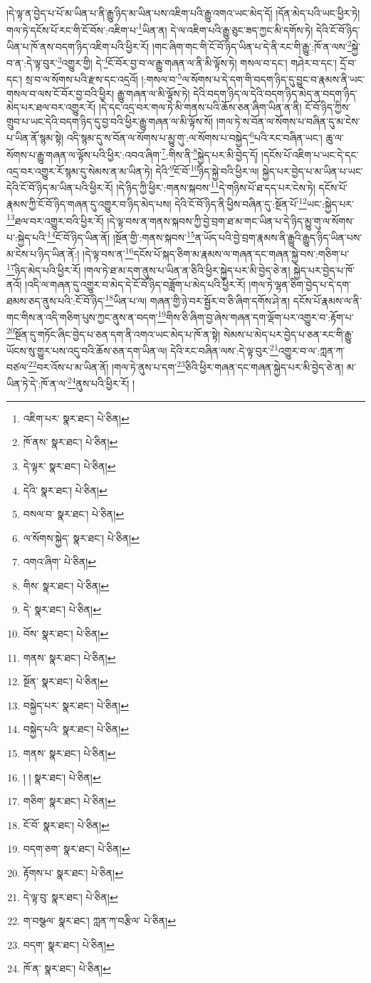 །དེ་ལྟ་ན་བྱེད་པ་པོ་མ་ཡིན་པ་ནི་རྒྱུ་ཉིད་མ་ཡིན་པས་འཇིག་པའི་རྒྱུ་འགའ་ཡང་མེད་དོ། །དོན་མེད་པའི་ཡང་ཕྱིར་ཏེ། གལ་ཏེ་དངོས་པོ་རང་གི་ངོ་བོས་:འཇིག་པ་\footnote{འཇིག་པར་  སྣར་ཐང་།  པེ་ཅིན། }ཡིན་ན། དེ་ལ་འཇིག་པའི་རྒྱུ་ཅུང་ཟད་ཀྱང་མི་དགོས་ཏེ། དེའི་ངོ་བོ་ཉིད་ཡིན་པ་ཁོ་ནས་བདག་ཉིད་འཇིག་པའི་ཕྱིར་རོ། །གང་ཞིག་གང་གི་ངོ་བོ་ཉིད་ཡིན་པ་དེ་ནི་རང་གི་རྒྱུ་:ཁོ་ན་ལས་\footnote{ཁོ་ནས་  སྣར་ཐང་།  པེ་ཅིན། }སྐྱེ་བ་ན་:དེ་ལྟ་བུར་\footnote{དེ་ལྟར་  སྣར་ཐང་།  པེ་ཅིན། }འགྱུར་གྱི། དེ་\footnote{དེའི་  སྣར་ཐང་།  པེ་ཅིན། }ངོ་བོར་བྱ་བ་ལ་རྒྱུ་གཞན་ལ་ནི་མི་ལྟོས་ཏེ། གསལ་བ་དང་། གཤེར་བ་དང་། དྲོ་བ་དང་། སྲ་བ་ལ་སོགས་པའི་རྫས་དང་འདྲའོ། །:གསལ་བ་\footnote{བསལ་བ་  སྣར་ཐང་།  པེ་ཅིན། }ལ་སོགས་པ་དེ་དག་གི་བདག་ཉིད་དུ་བྱུང་བ་རྣམས་ནི་ཡང་གསལ་བ་ལས་ངོ་བོར་བྱ་བའི་ཕྱིར། རྒྱུ་གཞན་ལ་མི་ལྟོས་ཏེ། དེའི་བདག་ཉིད་ལ་དེའི་བདག་ཉིད་མེད་ན་བདག་ཉིད་མེད་པར་ཐལ་བར་འགྱུར་རོ། །དེ་དང་འདྲ་བར་གལ་ཏེ་མི་གནས་པའི་ཆོས་ཅན་ཞིག་ཡིན་ན་ནི། ངོ་བོ་ཉིད་ཀྱིས་གྲུབ་པ་ཡང་དེའི་བདག་ཉིད་དུ་བྱ་བའི་ཕྱིར་རྒྱུ་གཞན་ལ་མི་ལྟོས་སོ། །གལ་ཏེ་ས་བོན་ལ་སོགས་པ་བཞིན་དུ་མ་ངེས་པ་ཡིན་ནོ་སྙམ་སྟེ། འདི་སྙམ་དུ་ས་བོན་ལ་སོགས་པ་མྱུ་གུ་:ལ་སོགས་པ་བསྐྱེད་\footnote{ལ་སོགས་སྐྱེད་  སྣར་ཐང་།  པེ་ཅིན། }པའི་རང་བཞིན་ཡང་། ཆུ་ལ་སོགས་པ་རྒྱུ་གཞན་ལ་ལྟོས་པའི་ཕྱིར་:འབའ་ཞིག་\footnote{འགའ་ཞིག་  པེ་ཅིན། }:གིས་ནི་\footnote{གིས་  སྣར་ཐང་།  པེ་ཅིན། }སྐྱེད་པར་མི་བྱེད་དོ། །དངོས་པོ་འཇིག་པ་ཡང་དེ་དང་འདྲ་བར་འགྱུར་རོ་སྙམ་དུ་སེམས་ན་མ་ཡིན་ཏེ། དེའི་\footnote{དེ་  སྣར་ཐང་།  པེ་ཅིན། }ངོ་བོ་\footnote{བོས་  སྣར་ཐང་།  པེ་ཅིན། }ཉིད་སྐྱེ་བའི་ཕྱིར་ལ། སྐྱེད་པར་བྱེད་པ་མ་ཡིན་པ་ཡང་དེའི་ངོ་བོ་ཉིད་མ་ཡིན་པའི་ཕྱིར་རོ། །དེ་ཉིད་ཀྱི་ཕྱིར་:གནས་སྐབས་\footnote{གནས་  སྣར་ཐང་།  པེ་ཅིན། }དེ་གཉིས་པོ་ཐ་དད་པར་ངེས་ཏེ། དངོས་པོ་རྣམས་ཀྱི་ངོ་བོ་ཉིད་གཞན་དུ་འགྱུར་བ་ཉིད་མེད་པས། དེའི་ངོ་བོ་ཉིད་ནི་ཕྱིས་བཞིན་དུ་:སྔོན་པོ་\footnote{སྔོན་  སྣར་ཐང་།  པེ་ཅིན། }ཡང་:སྐྱེད་པར་\footnote{བསྐྱེད་པར་  སྣར་ཐང་།  པེ་ཅིན། }ཐལ་བར་འགྱུར་བའི་ཕྱིར་རོ། །དེ་ལྟ་བས་ན་གནས་སྐབས་ཀྱི་བྱེ་བྲག་ཐ་མ་གང་ཡིན་པ་དེ་ཉིད་མྱུ་གུ་ལ་སོགས་པ་:སྐྱེད་པའི་\footnote{བསྐྱེད་པའི་  སྣར་ཐང་།  པེ་ཅིན། }ངོ་བོ་ཉིད་ཡིན་ནོ། །སྔོན་གྱི་:གནས་སྐབས་\footnote{གནས་  སྣར་ཐང་།  པེ་ཅིན། }ན་ཡོད་པའི་བྱེ་བྲག་རྣམས་ནི་རྒྱུའི་རྒྱུད་ཉིད་ཡིན་པས་མ་ངེས་པ་ཉིད་ཡིན་ནོ:། །དེ་ལྟ་བས་ན་\footnote{། །  སྣར་ཐང་།  པེ་ཅིན། }དངོས་པོ་སྐད་ཅིག་མ་རྣམས་ལ་གཞན་དང་གཞན་སྐྱེ་བས་:གཅིག་པ་\footnote{གཅིག་  སྣར་ཐང་།  པེ་ཅིན། }ཉིད་མེད་པའི་ཕྱིར་རོ། །གལ་ཏེ་ཐ་མ་དག་ནུས་པ་ཡིན་ན་ཅིའི་ཕྱིར་སྐྱེད་པར་མི་བྱེད་ཅེ་ན། སྐྱེད་པར་བྱེད་པ་ཁོ་ནའོ། །འདི་ལ་གཞན་དུ་འགྱུར་བ་མེད་དེ་ངོ་བོ་ཉིད་བཟློག་པ་མེད་པའི་ཕྱིར་རོ། །གལ་ཏེ་ལྷན་ཅིག་བྱེད་པ་དེ་དག་ཐམས་ཅད་ནུས་པའི་:ངོ་བོ་ཉིད་\footnote{ངོ་བོ་  སྣར་ཐང་།  པེ་ཅིན། }ཡིན་པ་ལ། གཞན་གྱི་ཉེ་བར་སྦྱོར་བ་ཅི་ཞིག་དགོས་ཤེ་ན། དངོས་པོ་རྣམས་ལ་ནི་གང་གིས་ན་འདི་གཅིག་པུས་ཀྱང་ནུས་ན་བདག་\footnote{བདག་ཅག་  སྣར་ཐང་།  པེ་ཅིན། }གིས་ཅི་ཞིག་བྱ་ཞེས་གཞན་དག་ལྡོག་པར་འགྱུར་བ་:རྟོག་པ་\footnote{རྟོགས་པ་  སྣར་ཐང་།  པེ་ཅིན། }སྔོན་དུ་གཏོང་ཞིང་བྱེད་པ་ཅན་དག་ནི་འགའ་ཡང་མེད་པ་ཁོ་ན་སྟེ། སེམས་པ་མེད་པར་བྱེད་པ་ཅན་རང་གི་རྒྱུ་ཡོངས་སུ་གྱུར་པས་འདུ་བའི་ཆོས་ཅན་དག་ཡིན་ལ། དེའི་རང་བཞིན་ལས་:དེ་ལྟ་བུར་\footnote{དེ་ལྟ་བུ་  སྣར་ཐང་།  པེ་ཅིན། }འགྱུར་བ་ལ་:ཀླན་ཀ་བཙལ་\footnote{ག་བསྩལ་  སྣར་ཐང་། ཀླན་ཀ་བརྩིལ་  པེ་ཅིན། }བར་འོས་པ་མ་ཡིན་ནོ། །གལ་ཏེ་ནུས་པ་དག་\footnote{བདག་  སྣར་ཐང་།  པེ་ཅིན། }ཅིའི་ཕྱིར་གཞན་དང་གཞན་སྐྱེད་པར་མི་བྱེད་ཅེ་ན། མ་ཡིན་ཏེ་དེ་:ཁོ་ན་ལ་\footnote{ཁོ་ན་  སྣར་ཐང་།  པེ་ཅིན། }ནུས་པའི་ཕྱིར་རོ། །
